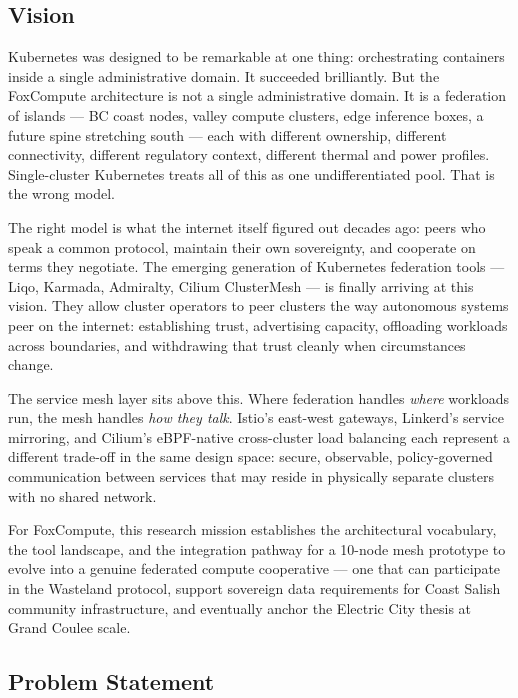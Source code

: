 \documentclass[11pt,letterpaper]{article}
\begin{document}
\subsection{Vision}

Kubernetes was designed to be remarkable at one thing: orchestrating containers inside a single administrative domain. It succeeded brilliantly. But the FoxCompute architecture is not a single administrative domain. It is a federation of islands --- BC coast nodes, valley compute clusters, edge inference boxes, a future spine stretching south --- each with different ownership, different connectivity, different regulatory context, different thermal and power profiles. Single-cluster Kubernetes treats all of this as one undifferentiated pool. That is the wrong model.

The right model is what the internet itself figured out decades ago: peers who speak a common protocol, maintain their own sovereignty, and cooperate on terms they negotiate. The emerging generation of Kubernetes federation tools --- Liqo, Karmada, Admiralty, Cilium ClusterMesh --- is finally arriving at this vision. They allow cluster operators to peer clusters the way autonomous systems peer on the internet: establishing trust, advertising capacity, offloading workloads across boundaries, and withdrawing that trust cleanly when circumstances change.

The service mesh layer sits above this. Where federation handles \textit{where} workloads run, the mesh handles \textit{how they talk}. Istio's east-west gateways, Linkerd's service mirroring, and Cilium's eBPF-native cross-cluster load balancing each represent a different trade-off in the same design space: secure, observable, policy-governed communication between services that may reside in physically separate clusters with no shared network.

For FoxCompute, this research mission establishes the architectural vocabulary, the tool landscape, and the integration pathway for a 10-node mesh prototype to evolve into a genuine federated compute cooperative --- one that can participate in the Wasteland protocol, support sovereign data requirements for Coast Salish community infrastructure, and eventually anchor the Electric City thesis at Grand Coulee scale.

\subsection{Problem Statement}
\end{document}
